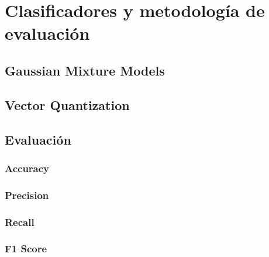 \chapter{Clasificadores y metodolog\'ia de evaluaci\'on} \label{chap:baafda}


\section{Gaussian Mixture Models}
\section{Vector Quantization}
\section{Evaluaci\'on}
\subsection{Accuracy}	
\subsection{Precision}
\subsection{Recall}
\subsection{F1 Score}	